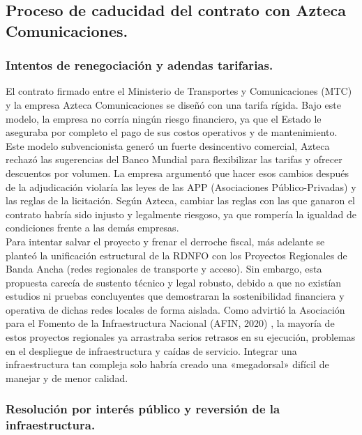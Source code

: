 \subsection{Proceso de caducidad del contrato con Azteca Comunicaciones.}
\subsubsection{Intentos de renegociación y adendas tarifarias.}

El contrato firmado entre el Ministerio de Transportes y Comunicaciones (MTC) y la empresa Azteca 
Comunicaciones se diseñó con una tarifa rígida. Bajo este modelo, la empresa no corría ningún riesgo 
financiero, ya que el Estado le aseguraba por completo el pago de sus costos operativos y de mantenimiento.\\
Este modelo subvencionista generó un fuerte desincentivo comercial, Azteca rechazó las sugerencias del 
Banco Mundial para flexibilizar las tarifas y ofrecer descuentos por volumen. La empresa argumentó que hacer 
esos cambios después de la adjudicación violaría las leyes de las APP (Asociaciones Público-Privadas) y las 
reglas de la licitación. Según Azteca, cambiar las reglas con las que ganaron el contrato habría sido injusto 
y legalmente riesgoso, ya que rompería la igualdad de condiciones frente a las demás empresas. \\

Para intentar salvar el proyecto y frenar el derroche fiscal, más adelante se planteó la unificación estructural de 
la RDNFO con los Proyectos Regionales de Banda Ancha (redes regionales de transporte y acceso). Sin embargo, 
esta propuesta carecía de sustento técnico y legal robusto, debido a que no existían estudios ni pruebas concluyentes que 
demostraran la sostenibilidad financiera y operativa de dichas redes locales de forma aislada. Como advirtió la Asociación para el Fomento de la Infraestructura Nacional (AFIN, 2020)
, la mayoría de estos proyectos regionales ya arrastraba serios retrasos en su ejecución, problemas en el despliegue de infraestructura 
y caídas de servicio. Integrar una infraestructura tan compleja solo habría creado una «megadorsal» 
difícil de manejar y de menor calidad.

\subsubsection{Resolución por interés público y reversión de la infraestructura.}

